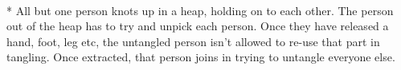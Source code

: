 \begin{minipage}{\textwidth}
\\*
All but one person knots up in a heap, holding on to each other.  The person out of the heap has to try and unpick each person.  Once they have released a hand, foot, leg etc, the untangled person isn't allowed to re-use that part in tangling.  Once extracted, that person joins in trying to untangle everyone else.
\end{minipage}    \vfill
